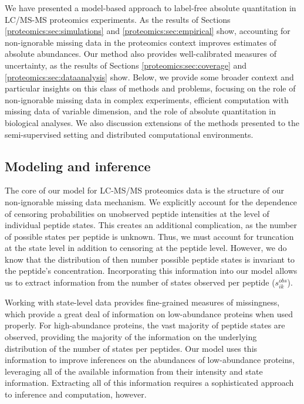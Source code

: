 We have presented a model-based approach to label-free absolute quantitation in LC/MS-MS proteomics experiments.
As the results of Sections \ref{proteomics:sec:simulations} and \ref{proteomics:sec:empirical} show, accounting for non-ignorable missing data in the proteomics context improves estimates of absolute abundances.
Our method also provides well-calibrated measures of uncertainty, as the results of Sections \ref{proteomics:sec:coverage} and \ref{proteomics:sec:dataanalysis} show.
Below, we provide some broader context and particular insights on this class of methods and problems, focusing on the role of non-ignorable missing data in complex experiments, efficient computation with missing data of variable dimension, and the role of absolute quantitation in biological analyses.
We also discussion extensions of the methods presented to the semi-supervised setting and distributed computational environments.

\subsection{Modeling and inference}

The core of our model for LC-MS/MS proteomics data is the structure of our non-ignorable missing data mechanism.
We explicitly account for the dependence of censoring probabilities on unobserved peptide intensities at the level of individual peptide states.
This creates an additional complication, as the number of possible states per peptide is unknown.
Thus, we must account for truncation at the state level in addition to censoring at the peptide level.
However, we do know that the distribution of then number possible peptide states is invariant to the peptide's concentration.
Incorporating this information into our model allows us to extract information from the number of states observed per peptide ($s_{ik}^{obs}$).

Working with state-level data provides fine-grained measures of missingness, which provide a great deal of information on low-abundance proteins when used properly.
For high-abundance proteins, the vast majority of peptide states are observed, providing the majority of the information on the underlying distribution of the number of states per peptides.
Our model uses this information to improve inferences on the abundances of low-abundance proteins, leveraging all of the available information from their intensity and state information.
Extracting all of this information requires a sophisticated approach to inference and computation, however.

